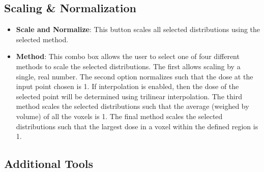 \documentclass[12pt]{article}
\begin{document}
  
  \subsection{Scaling \& Normalization}
  
  \begin{itemize}
  \item{\bf{Scale and Normalize}}:
  This button scales all selected distributions using the selected method.

  \item{\bf{Method}}:
  This combo box allows the user to select one of four different methods to scale the selected distributions.  The first allows scaling by a single, real number.  The second option normalizes such that the dose at the input point chosen is 1.  If interpolation is enabled, then the dose of the selected point will be determined using trilinear interpolation.  The third method scales the selected distributions such that the average (weighed by volume) of all the voxels is 1.  The final method scales the selected distributions such that the largest dose in a voxel within the defined region is 1.
  \end{itemize}

  
  \subsection{Additional Tools}
  
\end{document}
